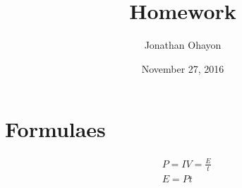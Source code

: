 \documentclass[12pt, oneside]{article}
\title{Homework}
\author{Jonathan Ohayon}
\date{November 27, 2016}
\begin{document}
\maketitle

\section{Formulaes}
\begin{equation*}
\begin{split}
& P = IV = \frac{E}{t}\\
& E = Pt
\end{split}
\end{equation*}
\end{document}
